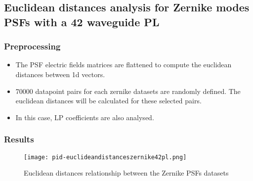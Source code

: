 \subsection{Euclidean distances analysis for Zernike modes PSFs with a 42 waveguide PL}

	\subsubsection{Preprocessing}
		
		\begin{itemize}
			\item The PSF electric fields matrices are flattened to compute the euclidean distances between 1d vectors.
			\item 70000 datapoint pairs for each zernike datasets are randomly defined. The euclidean distances will be calculated for these selected pairs.
			\item In this case, LP coefficients are also analysed.
		\end{itemize}
			
	\subsubsection{Results}
		\begin{figure*}[ht!]
			\centering
			\texttt{[image: pid-euclideandistanceszernike42pl.png]}
			\caption{Euclidean distances relationship between the Zernike PSFs datasets}
		\end{figure*}
    
    
     
		\FloatBarrier